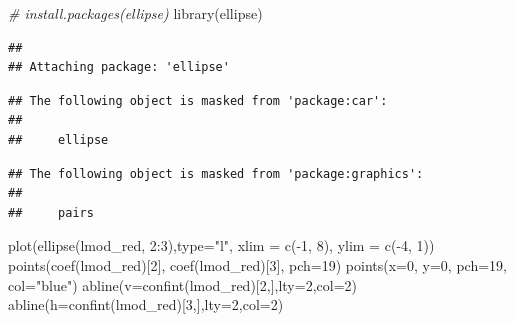\documentclass[
]{article}
\newenvironment{Shaded}{\begin{snugshade}}{\end{snugshade}}
\newcommand{\AttributeTok}[1]{\textcolor[rgb]{0.77,0.63,0.00}{#1}}
\newcommand{\CommentTok}[1]{\textcolor[rgb]{0.56,0.35,0.01}{\textit{#1}}}
\newcommand{\DecValTok}[1]{\textcolor[rgb]{0.00,0.00,0.81}{#1}}
\newcommand{\FunctionTok}[1]{\textcolor[rgb]{0.00,0.00,0.00}{#1}}
\newcommand{\NormalTok}[1]{#1}
\newcommand{\SpecialCharTok}[1]{\textcolor[rgb]{0.00,0.00,0.00}{#1}}
\newcommand{\StringTok}[1]{\textcolor[rgb]{0.31,0.60,0.02}{#1}}
\begin{document}
\begin{Shaded}
\begin{Highlighting}[]
\CommentTok{\# install.packages(\textquotesingle{}ellipse\textquotesingle{})}
\FunctionTok{library}\NormalTok{(ellipse)}
\end{Highlighting}
\end{Shaded}

\begin{verbatim}
## 
## Attaching package: 'ellipse'
\end{verbatim}

\begin{verbatim}
## The following object is masked from 'package:car':
## 
##     ellipse
\end{verbatim}

\begin{verbatim}
## The following object is masked from 'package:graphics':
## 
##     pairs
\end{verbatim}

\begin{Shaded}
\begin{Highlighting}[]
\FunctionTok{plot}\NormalTok{(}\FunctionTok{ellipse}\NormalTok{(lmod\_red, }\DecValTok{2}\SpecialCharTok{:}\DecValTok{3}\NormalTok{),}\AttributeTok{type=}\StringTok{"l"}\NormalTok{, }\AttributeTok{xlim =} \FunctionTok{c}\NormalTok{(}\SpecialCharTok{{-}}\DecValTok{1}\NormalTok{, }\DecValTok{8}\NormalTok{), }\AttributeTok{ylim =} \FunctionTok{c}\NormalTok{(}\SpecialCharTok{{-}}\DecValTok{4}\NormalTok{, }\DecValTok{1}\NormalTok{))}
\FunctionTok{points}\NormalTok{(}\FunctionTok{coef}\NormalTok{(lmod\_red)[}\DecValTok{2}\NormalTok{], }\FunctionTok{coef}\NormalTok{(lmod\_red)[}\DecValTok{3}\NormalTok{], }\AttributeTok{pch=}\DecValTok{19}\NormalTok{)}
\FunctionTok{points}\NormalTok{(}\AttributeTok{x=}\DecValTok{0}\NormalTok{, }\AttributeTok{y=}\DecValTok{0}\NormalTok{, }\AttributeTok{pch=}\DecValTok{19}\NormalTok{, }\AttributeTok{col=}\StringTok{"blue"}\NormalTok{)}
\FunctionTok{abline}\NormalTok{(}\AttributeTok{v=}\FunctionTok{confint}\NormalTok{(lmod\_red)[}\DecValTok{2}\NormalTok{,],}\AttributeTok{lty=}\DecValTok{2}\NormalTok{,}\AttributeTok{col=}\DecValTok{2}\NormalTok{)}
\FunctionTok{abline}\NormalTok{(}\AttributeTok{h=}\FunctionTok{confint}\NormalTok{(lmod\_red)[}\DecValTok{3}\NormalTok{,],}\AttributeTok{lty=}\DecValTok{2}\NormalTok{,}\AttributeTok{col=}\DecValTok{2}\NormalTok{)}
\end{Highlighting}
\end{Shaded}
\end{document}
